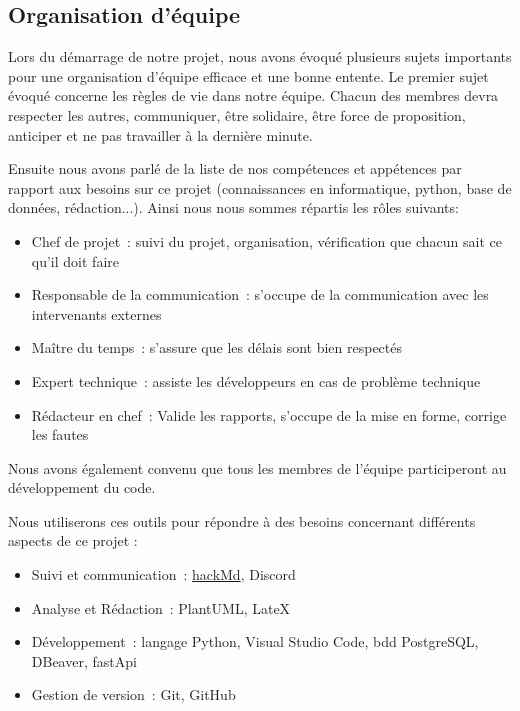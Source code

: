 \documentclass[11pt]{article}
\begin{document}
\subsection{Organisation d'équipe}

Lors du démarrage de notre projet, nous avons évoqué plusieurs sujets importants pour une organisation d'équipe efficace et une bonne entente. Le premier sujet évoqué concerne les règles de vie dans notre équipe. Chacun des membres devra respecter les autres, communiquer, être solidaire, être force de proposition, anticiper et ne pas travailler à la dernière minute.


\bigbreak

Ensuite nous avons parlé de la liste de nos compétences et appétences par rapport aux besoins sur ce projet (connaissances en informatique, python, base de données, rédaction...). Ainsi nous nous sommes répartis les rôles suivants:
\begin{itemize}
    \item{Chef de projet~: suivi du projet, organisation, vérification que chacun sait ce qu’il doit faire}
    \item{Responsable de la communication~: s'occupe de la communication avec les intervenants externes}
    \item{Maître du temps~: s’assure que les délais sont bien respectés}
    \item{Expert technique~: assiste les développeurs en cas de problème technique}
    \item{Rédacteur en chef~: Valide les rapports, s'occupe de la mise en forme, corrige les fautes}
\end{itemize}

Nous avons également convenu que tous les membres de l'équipe participeront au développement du code.

\bigbreak

Nous utiliserons ces outils pour répondre à des besoins concernant différents aspects de ce projet :
\begin{itemize}
    \item{Suivi et communication~: \href{https://hackmd.io/CMTCDVW6Spe2PHXOhdKTRQ}{hackMd}, Discord}
    \item{Analyse et Rédaction~: PlantUML, LateX}
    \item{Développement~: langage Python, Visual Studio Code, bdd PostgreSQL, DBeaver, fastApi}
    \item{Gestion de version~: Git, GitHub}
\end{itemize}
\end{document}
